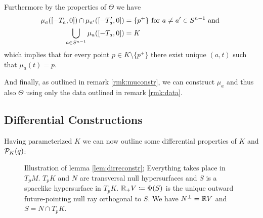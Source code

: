 Furthermore by the properties of $\Theta$ we have 
\begin{align}
    \mu_a([-T_a,0])\cap \mu_{a'}([-T_a',0]) &= \{p^+\} \text{ for } a\neq a'\in {S^{n-1}} \text{ and }\\
    \bigcup_{a\in {S^{n-1}}}\mu_a([-T_a,0]) &= K
\end{align} which implies that for every point $p\in K\setminus \{p^+\}$ there exist unique $(a,t)$ such that $\mu_a(t)=p$. 

And finally, as outlined in remark \ref{rmk:muconstr}, we can construct $\mu_a$ and thus also $\Theta$ using only the data outlined in remark \ref{rmk:data}.

\subsection{Differential Constructions}
Having parameterized $K$ we can now outline some differential properties of $K$ and ${\mathcal{P}}_K(q)$:

\begin{figure}\label{fig:DirReconstr}
    \centering
    
    \caption{Illustration of lemma \ref{lem:dirreconstr}; Everything takes place in $T_pM$. $T_pK$ and $N$ are transversal null hypersurfaces and $S$ is a spacelike hypersurface in $T_pK$. $\mathbb{R}_+V\coloneqq \Phi(S)$ is the unique outward future-pointing null ray orthogonal to $S$. 
    We have $N^\perp = \mathbb{R} V$ and $S = N \cap T_pK$.}
\end{figure}

